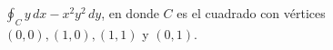 \item $\oint_C y \, dx - x^2y^2 \, dy$, en donde $C$ es el cuadrado con vértices $(0, 0), (1, 0), (1, 1)$ y $(0, 1)$.
